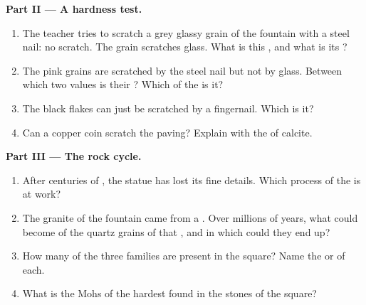 \begin{problem}
\medskip
\noindent\textbf{Part II --- A hardness test.}
\begin{enumerate}[resume]
  \item The teacher tries to scratch a grey glassy grain of the fountain
        with a steel nail: no scratch. The grain scratches glass. What is
        this , and what is its ?
  \item The pink grains are scratched by the steel nail but not by glass.
        Between which two values is their ? Which  of the
         is it?
  \item The black flakes can just be scratched by a fingernail. Which
         is it?
  \item Can a copper coin scratch the paving? Explain with the  of
        calcite.
\end{enumerate}

\medskip
\noindent\textbf{Part III --- The rock cycle.}
\begin{enumerate}[resume]
  \item After centuries of , the statue has lost its fine details.
        Which process of the  is at work?
  \item The granite of the fountain came from a . Over millions
        of years, what could become of the quartz grains of that ,
        and in which  could they end up?
  \item How many of the three  families are present in the square?
        Name the  or  of each.
  \item What is the Mohs  of the hardest  found in the
        stones of the square?
\end{enumerate}
\end{problem}
